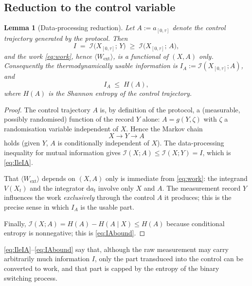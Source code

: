 \documentclass{amsart}
\newtheorem{lemma}{Lemma}
\theoremstyle{definition}
\newcommand{\Wext}{\langle W_{\mathrm{ext}}\rangle}
\newcommand{\dd}{\mathrm{d}}
\begin{document}
\subsection{Reduction to the control variable}

\begin{lemma}[Data-processing reduction]\label{lem:dpi}
Let $A:=a_{[0,\tau]}$ denote the control trajectory generated by the protocol.
Then
\begin{equation}\label{eq:IleIA}
I \;=\; \mathcal I\!\bigl(X_{[0,\tau]};\,Y\bigr)\;\ge\;
\mathcal I\!\bigl(X_{[0,\tau]};\,A\bigr),
\end{equation}
and the work \eqref{eq:work}, hence $\Wext$, is a functional of $(X,A)$ only.
Consequently the thermodynamically \emph{usable} information is
$I_A:=\mathcal I(X_{[0,\tau]};A)$, and
\begin{equation}\label{eq:IAbound}
I_A \;\le\; H(A),
\end{equation}
where $H(A)$ is the Shannon entropy of the control trajectory.
\end{lemma}

\begin{proof}
The control trajectory $A$ is, by definition of the protocol, a
(measurable, possibly randomised) function of the record $Y$ alone:
$A=g(Y,\zeta)$ with $\zeta$ a randomisation variable independent of $X$. Hence
the Markov chain
\[
X \longrightarrow Y \longrightarrow A
\]
holds (given $Y$, $A$ is conditionally independent of $X$). The data-processing
inequality for mutual information gives
$\mathcal I(X;A)\le \mathcal I(X;Y)=I$, which is \eqref{eq:IleIA}.

That $\Wext$ depends on $(X,A)$ only is immediate from \eqref{eq:work}: the
integrand $V(X_t)$ and the integrator $\dd a_t$ involve only $X$ and $A$. The
measurement record $Y$ influences the work \emph{exclusively} through the
control $A$ it produces; this is the precise sense in which $I_A$ is the
usable part.

Finally, $\mathcal I(X;A)=H(A)-H(A\mid X)\le H(A)$ because conditional entropy
is nonnegative; this is \eqref{eq:IAbound}.
\end{proof}

\eqref{eq:IleIA}--\eqref{eq:IAbound} say that, although the raw measurement may
carry arbitrarily much information $I$, only the part transduced into the
control can be converted to work, and that part is capped by the entropy of the
binary switching process.
\end{document}
